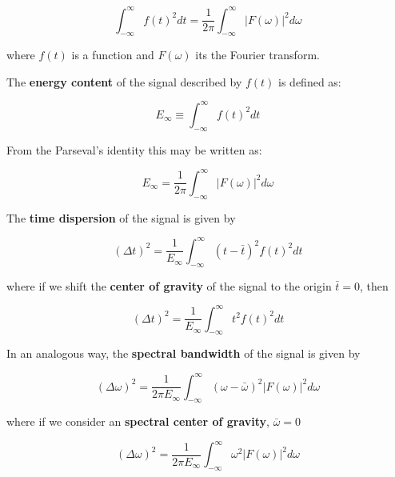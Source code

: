\begin{equation}
	\int_{-\infty}^{\infty} f(t)^2 dt = \frac{1}{2 \pi} \int_{-\infty}^{\infty} |F(\omega)|^2 d\omega
\end{equation}

where $f(t)$ is a function and $F(\omega)$ its the Fourier transform. 

The \textbf{energy content} of the signal described by $f(t)$ is defined as:

\begin{equation}\label{eq:energy_content_time}
    E_{\infty} \equiv \int_{-\infty}^{\infty}  f(t)^2 dt
\end{equation}


From the Parseval's identity this may be written as:

\begin{equation}\label{eq:energy_content_frequency}
    E_{\infty} = \frac{1}{2 \pi} \int_{-\infty}^{\infty} |F(\omega)|^2 d\omega
\end{equation}

The \textbf{time dispersion} of the signal is given by

\begin{equation}\label{eq:}
    (\Delta t)^2 = \frac{1}{E_{\infty}} \int_{-\infty}^{\infty} (t-\bar{t})^2 f(t)^2 dt
\end{equation}


where if we shift the \textbf{center of gravity} of the signal to the origin $\bar{t}=0$, then

\begin{equation}\label{eq:time_dispersion}
    (\Delta t)^2 = \frac{1}{E_{\infty}} \int_{-\infty}^{\infty} t^2 f(t)^2 dt
\end{equation}

In an analogous way, the \textbf{spectral bandwidth} of the signal is given by

\begin{equation}\label{eq:}
    (\Delta \omega)^2 = \frac{1}{2 \pi E_{\infty}} \int_{-\infty}^{\infty} (\omega-\bar{\omega})^2 |F(\omega)|^2 d\omega
\end{equation}

where if we consider an \textbf{spectral center of gravity}, $\bar{\omega}=0$

\begin{equation}\label{eq:spectral_bandwidth}
    (\Delta \omega)^2 = \frac{1}{2 \pi E_{\infty}} \int_{-\infty}^{\infty} \omega^2 |F(\omega)|^2 d\omega 
\end{equation}

